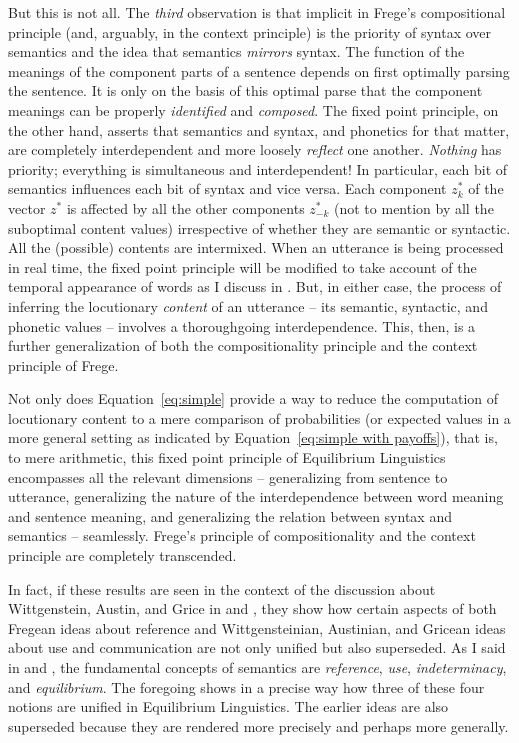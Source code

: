 But this is not all. The \emph{third} observation is that implicit in Frege's compositional principle (and, arguably, in the context principle) is the priority of syntax over semantics and the idea that semantics \emph{mirrors} syntax. The function of the meanings of the component parts of a sentence depends on first optimally parsing the sentence. It is only on the basis of this optimal parse that the component meanings can be properly \emph{identified} and \emph{composed}. The fixed point principle, on the other hand, asserts that semantics and syntax, and phonetics for that matter, are completely interdependent and more loosely \emph{reflect} one another. \emph{Nothing} has priority; everything is simultaneous and interdependent! In particular, each bit of semantics influences each bit of syntax and vice versa. Each component $z^{\ast}_k$ of the vector $z^{\ast}$ is affected by all the other components $z^{\ast}_{-k}$ (not to mention by all the suboptimal content values) irrespective of whether they are semantic or syntactic. All the (possible) contents are intermixed. When an utterance is being processed in real time, the fixed point principle will be modified to take account of the temporal appearance of words as I discuss in . But, in either case, the process of inferring the locutionary \emph{content} of an utterance -- its semantic, syntactic, and phonetic values -- involves a thoroughgoing interdependence. This, then, is a further generalization of both the compositionality principle and the context principle of Frege. 

Not only does Equation~\ref{eq:simple} provide a way to reduce the computation of locutionary content to a mere comparison of probabilities (or expected values in a more general setting as indicated by Equation~\ref{eq:simple with payoffs}), that is, to mere arithmetic, this fixed point principle of Equilibrium Linguistics encompasses all the relevant dimensions -- generalizing from sentence to utterance, generalizing the nature of the interdependence between word meaning and sentence meaning, and generalizing the relation between syntax and semantics -- seamlessly. Frege's principle of compositionality and the context principle are completely transcended. 

In fact, if these results are seen in the context of the discussion about Wittgenstein, Austin, and Grice in  and , they show how certain aspects of both Fregean ideas about reference and Wittgensteinian, Austinian, and Gricean ideas about use and communication are not only unified but also superseded. As I said in \citet{parikh:le} and , the fundamental concepts of semantics are \emph{reference}, \emph{use}, \emph{indeterminacy}, and \emph{equilibrium}. The foregoing shows in a precise way how three of these four notions are unified in Equilibrium Linguistics. The earlier ideas are also superseded because they are rendered more precisely and perhaps more generally. 

